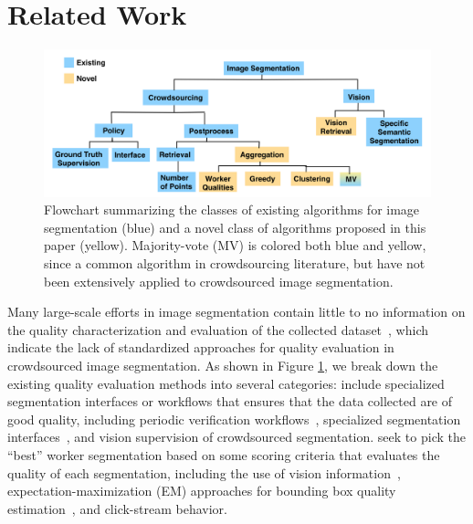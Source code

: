 \section{Related Work\label{sec:related}}
\begin{figure}[h!]
\centering
\includegraphics[width=\linewidth]{plots/flowchart.png}
\caption{Flowchart summarizing the classes of existing algorithms for image segmentation (blue) and a novel class of algorithms proposed in this paper (yellow). Majority-vote (MV) is colored both blue and yellow, since a common algorithm in crowdsourcing literature, but have not been extensively applied to crowdsourced image segmentation.}
\label{flowchart}
\end{figure}
Many large-scale efforts in image segmentation contain little to no information on the quality characterization and evaluation of the collected dataset~\cite{Torralba2010,MartinFTM01,Li2009,Gurari2015}, which indicate the lack of standardized approaches for quality evaluation in crowdsourced image segmentation. As shown in Figure \ref{flowchart}, we break down the existing quality evaluation methods into several categories:
 include specialized segmentation interfaces or workflows that ensures that the data collected are of good quality, including periodic verification workflows~\cite{Lin2014,Everingham15}, specialized segmentation interfaces~\cite{Song2018}, and vision supervision of crowdsourced segmentation\cite{Russakovsky2015,Gurari2016}. %
 seek to pick the ``best'' worker segmentation based on some scoring criteria that evaluates the quality of each segmentation, including the use of vision information~\cite{Vittayakorn2011,Russakovsky2015}, expectation-maximization (EM) approaches for bounding box quality estimation~\cite{MDWWelinder2010}, and click-stream behavior\cite{Cabezas2015,Sameki2015,Sorokin2008}.

